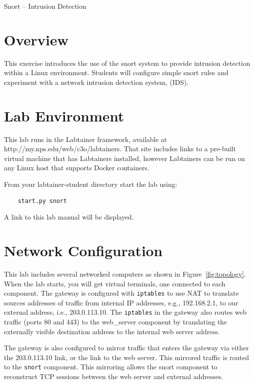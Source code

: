 


\begin{center}
{\LARGE Snort -- Intrusion Detection}
\vspace{0.1in}\\
\end{center}

\copyrightnotice

\section{Overview}
This exercise introduces the use of the snort system
to provide intrusion detection within a
Linux environment.  Students will configure simple 
snort rules and experiment with a network 
intrusion detection system, (IDS).  


\section{Lab Environment}
This lab runs in the Labtainer framework,
available at http://my.nps.edu/web/c3o/labtainers.
That site includes links to a pre-built virtual machine
that has Labtainers installed, however Labtainers can
be run on any Linux host that supports Docker containers.

From your labtainer-student directory start the lab using:
\begin{verbatim}
    start.py snort
\end{verbatim}
\noindent A link to this lab manual will be displayed.  

\section{Network Configuration}
This lab includes several networked computers as shown in Figure~\ref{fig:topology}.
When the lab starts, you will get virtual terminals, one connected to each
component.  The gateway is configured with {\tt iptables} to use NAT to translate
sources addresses of traffic from internal IP addresses, e.g., 192.168.2.1, to
our external address, i.e., 203.0.113.10.  The {\tt iptables} in the gateway also
routes web traffic (ports 80 and 443) to the web\_server component by translating
the externally visible destination address to the internal web server address.

The gateway is also configured to mirror traffic that enters the gateway 
via either the 203.0.113.10 link, or the link to the web server.  This
mirrored traffic is routed to the {\tt snort} component.  This mirroring allows
the snort component to reconstruct TCP sessions between the web server and external
addresses.

